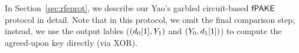 In Section~\ref{sec:rfeprot}, we describe our Yao's garbled circuit-based $\textsf{fPAKE}$ protocol in detail.
Note that in this protocol, we omit the final comparison step; instead, we use the output lables ($(d_{0}[1], Y_{1})$ and $(Y_{0}, d_{1}[1])$) to compute the agreed-upon key directly (via XOR).
